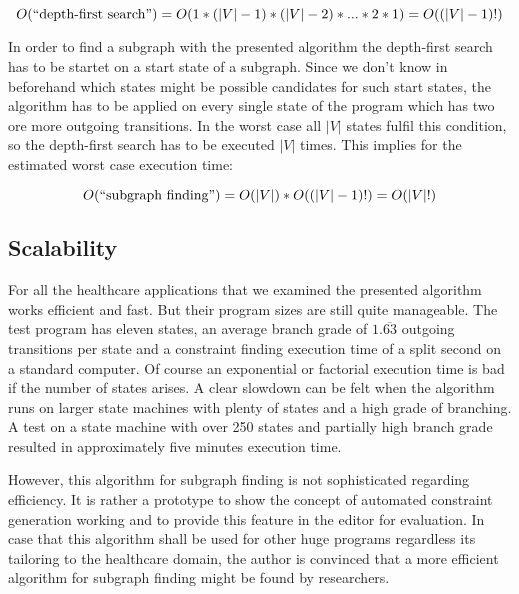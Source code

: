 \begin{equation}
O(\textnormal{``depth-first search''})=O(1*(|V|-1)*(|V|-2)*...*2*1)=O((|V|-1)!)
\end{equation}

In order to find a subgraph with the presented algorithm the depth-first search has to be startet on a start state of a subgraph. Since we don't know in beforehand which states might be possible candidates for such start states, the algorithm has to be applied on every single state of the program which has two ore more outgoing transitions. In the worst case all $|V|$ states fulfil this condition, so the depth-first search has to be executed $|V|$ times. This implies for the estimated worst case execution time:

\begin{equation}
O(\textnormal{``subgraph finding''})=O(|V|)*O((|V|-1)!)=O(|V|!)
\end{equation}



\subsection{Scalability}

For all the healthcare applications that we examined the presented algorithm works efficient and fast. But their program sizes are still quite manageable. The test program has eleven states, an average branch grade of $1.\overline{63}$ outgoing transitions per state and a constraint finding execution time of a split second on a standard computer.
Of course an exponential or factorial execution time is bad if the number of states arises. A clear slowdown can be felt when the algorithm runs on larger state machines with plenty of states and a high grade of branching. A test on a state machine with over 250 states and partially high branch grade resulted in approximately five minutes execution time.

However, this algorithm for subgraph finding is not sophisticated regarding efficiency. It is rather a prototype to show the concept of automated constraint generation working and to provide this feature in the editor for evaluation. In case that this algorithm shall be used for other huge programs regardless its tailoring to the healthcare domain, the author is convinced that a more efficient algorithm for subgraph finding might be found by researchers.






